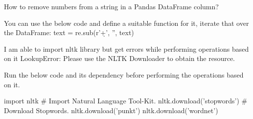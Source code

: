 	\begin{qanda}
		\begin{question}
How to remove numbers from a string in a Pandas DataFrame column?
		\end{question}
		\begin{answer}
You can use the below code and define a suitable function for it, iterate that over the DataFrame: text = re.sub(r'\d+', '', text)
		\end{answer}
	\end{qanda}

	\begin{qanda}
		\begin{question}
I am able to import nltk library but get errors while performing operations based on it LookupError: Please use the NLTK Downloader to obtain the resource.
		\end{question}
		\begin{answer}
Run the below code and its dependency before performing the operations based on it.

			\begin{code}[\codenumbering]{}
				\codeitemnonumber import nltk \# Import Natural Language Tool-Kit.
				\codeitemnonumber nltk.download('stopwords') \# Download Stopwords.
				\codeitemnonumber nltk.download('punkt')
				\codeitemnonumber nltk.download('wordnet')
			\end{code}
		\end{answer}
	\end{qanda}

